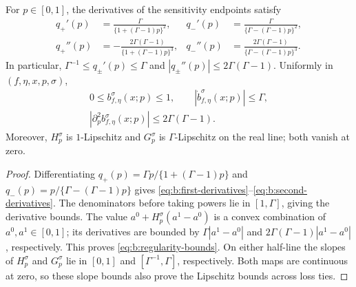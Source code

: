 \begin{lemma}
\label{lemma:b:regularity}
For $p\in[0,1]$, the derivatives of the sensitivity endpoints satisfy
\begin{align}
 q_+'(p)&=\frac{\Gamma}{\{1+(\Gamma-1)p\}^2},&
 q_-'(p)&=\frac{\Gamma}{\{\Gamma-(\Gamma-1)p\}^2},\label{eq:b:first-derivatives}\\
 q_+''(p)&=-\frac{2\Gamma(\Gamma-1)}{\{1+(\Gamma-1)p\}^3},&
 q_-''(p)&=\frac{2\Gamma(\Gamma-1)}{\{\Gamma-(\Gamma-1)p\}^3}.
 \label{eq:b:second-derivatives}
\end{align}
In particular, $\Gamma^{-1}\leq q_\pm'(p)\leq\Gamma$ and
$|q_\pm''(p)|\leq 2\Gamma(\Gamma-1)$. Uniformly in $(f,\eta,x,p,\sigma)$,
\begin{equation}
 \begin{gathered}
 0\leq b^\sigma_{f,\eta}(x;p)\leq1,\qquad
 |\dot b^\sigma_{f,\eta}(x;p)|\leq\Gamma,\\
 |\partial_p^2 b^\sigma_{f,\eta}(x;p)|\leq2\Gamma(\Gamma-1).
 \end{gathered}
 \label{eq:b:regularity-bounds}
\end{equation}
Moreover, $H_p^\sigma$ is $1$-Lipschitz and $G_p^\sigma$ is
$\Gamma$-Lipschitz on the real line; both vanish at zero.
\end{lemma}

\begin{proof}
Differentiating $q_+(p)=\Gamma p/\{1+(\Gamma-1)p\}$ and
$q_-(p)=p/\{\Gamma-(\Gamma-1)p\}$ gives
\eqref{eq:b:first-derivatives}--\eqref{eq:b:second-derivatives}.
The denominators before taking powers lie in $[1,\Gamma]$, giving the
derivative bounds. The value $a^0+H_p^\sigma(a^1-a^0)$ is a convex
combination of $a^0,a^1\in[0,1]$; its derivatives are bounded by
$\Gamma|a^1-a^0|$ and $2\Gamma(\Gamma-1)|a^1-a^0|$, respectively.
This proves \eqref{eq:b:regularity-bounds}. On either half-line the slopes
of $H_p^\sigma$ and $G_p^\sigma$ lie in $[0,1]$ and
$[\Gamma^{-1},\Gamma]$, respectively. Both maps are continuous at zero,
so these slope bounds also prove the Lipschitz bounds across loss ties.
\end{proof}

